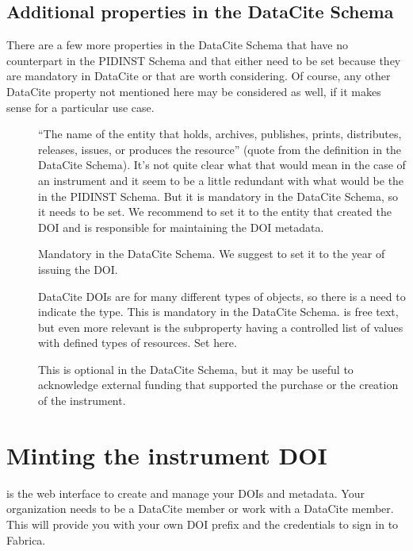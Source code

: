 \documentclass[a4paper,10pt,english]{sphinxmanual}
\begin{document}
\subsection{Additional properties in the DataCite Schema}
\label{\detokenize{datacite-cookbook/metadata:additional-properties-in-the-datacite-schema}}
\sphinxAtStartPar
There are a few more properties in the DataCite Schema that have no
counterpart in the PIDINST Schema and that either need to be set
because they are mandatory in DataCite or that are worth considering.
Of course, any other DataCite property not mentioned here may be
considered as well, if it makes sense for a particular use case.
\begin{description}
\item[{}] \leavevmode
\sphinxAtStartPar
“The name of the entity that holds, archives, publishes, prints,
distributes, releases, issues, or produces the resource” (quote from
the definition in the DataCite Schema).  It’s not quite clear what
that would mean in the case of an instrument and it seem to be a
little redundant with what would be the  in the PIDINST
Schema.  But it is mandatory in the DataCite Schema, so it needs to
be set.  We recommend to set it to the entity that created the DOI
and is responsible for maintaining the DOI metadata.

\item[{}] \leavevmode
\sphinxAtStartPar
Mandatory in the DataCite Schema.  We suggest to set it to the year
of issuing the DOI.

\item[{}] \leavevmode
\sphinxAtStartPar
DataCite DOIs are for many different types of objects, so there is a
need to indicate the type.  This is mandatory in the DataCite
Schema.   is free text, but even more relevant is the
subproperty  having a controlled list of values
with defined types of resources.  Set
 here.

\item[{}] \leavevmode
\sphinxAtStartPar
This is optional in the DataCite Schema, but it may be useful to
acknowledge external funding that supported the purchase or the
creation of the instrument.

\end{description}


\section{Minting the instrument DOI}
\label{\detokenize{datacite-cookbook/minting:minting-the-instrument-doi}}\label{\detokenize{datacite-cookbook/minting:datacite-cookbook-minting}}\label{\detokenize{datacite-cookbook/minting::doc}}
\sphinxAtStartPar
{} is the web interface to create and manage your
DOIs and metadata.  Your organization needs to be a DataCite member or
work with a DataCite member.  This will provide you with your own DOI
prefix and the credentials to sign in to Fabrica.
\end{document}
